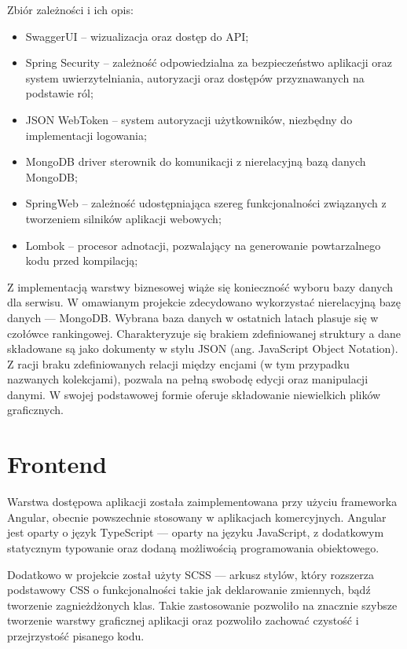 Zbiór zależności i ich opis:
\begin{itemize}
    \item SwaggerUI -- wizualizacja oraz dostęp do API;
    \item Spring Security -- zależność odpowiedzialna za bezpieczeństwo aplikacji oraz system uwierzytelniania, autoryzacji oraz dostępów przyznawanych na podstawie ról;
    \item JSON WebToken -- system autoryzacji użytkowników, niezbędny do implementacji logowania;
    \item MongoDB driver sterownik do komunikacji z nierelacyjną bazą danych MongoDB;
    \item SpringWeb -- zależność udostępniająca szereg funkcjonalności związanych z tworzeniem silników aplikacji webowych;
    \item Lombok -- procesor adnotacji, pozwalający na generowanie powtarzalnego kodu przed kompilacją;
\end{itemize}

Z implementacją warstwy biznesowej wiąże się konieczność wyboru bazy danych dla serwisu. W omawianym projekcie zdecydowano wykorzystać nierelacyjną bazę danych — MongoDB. Wybrana baza danych w ostatnich latach plasuje się w czołówce rankingowej. Charakteryzuje się brakiem zdefiniowanej struktury a dane składowane są jako dokumenty w stylu JSON (ang. JavaScript Object Notation). Z racji braku zdefiniowanych relacji między encjami (w tym przypadku nazwanych kolekcjami), pozwala na pełną swobodę edycji oraz manipulacji danymi. W swojej podstawowej formie oferuje składowanie niewielkich plików graficznych.

\section{Frontend}
Warstwa dostępowa aplikacji została zaimplementowana przy użyciu frameworka Angular, obecnie powszechnie stosowany w aplikacjach komercyjnych. Angular jest oparty o język TypeScript — oparty na języku JavaScript, z dodatkowym statycznym typowanie oraz dodaną możliwością programowania obiektowego.

Dodatkowo w projekcie został użyty SCSS — arkusz stylów, który rozszerza podstawowy CSS o funkcjonalności takie jak deklarowanie zmiennych, bądź tworzenie zagnieżdżonych klas. Takie zastosowanie pozwoliło na znacznie szybsze tworzenie warstwy graficznej aplikacji oraz pozwoliło zachować czystość i przejrzystość pisanego kodu.